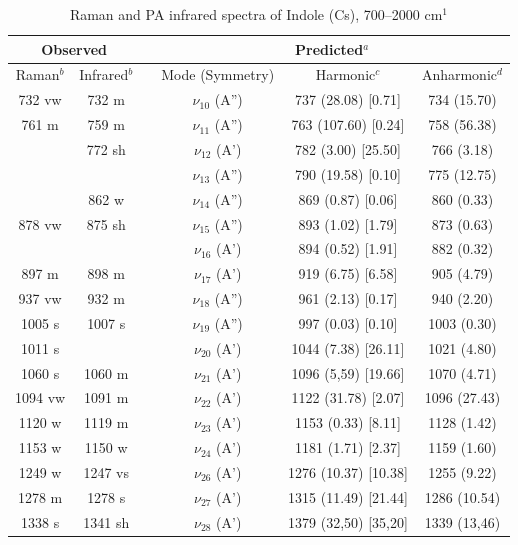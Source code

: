 	
		\begin{table}[H]
			\caption{Raman and PA infrared spectra of Indole (Cs), 700–2000 cm$^{1}$}
			\begin{center}
			\begin{tabular}{c c c c c c}
				\hline
				\multicolumn{ 2}{c}{Observed} & \multicolumn{1}{c}{} & \multicolumn{ 3}{c}{Predicted$^{a}$} \\ \hline
				Raman$^{b}$ & \multicolumn{1}{c}{Infrared$^{b}$} &  & \multicolumn{1}{c}{Mode (Symmetry)} & \multicolumn{1}{c}{Harmonic$^{c}$} & Anharmonic$^{d}$ \\ \hline
	732 vw & 732 m  &  & $\nu_{10}$ (A”) & 737 (28.08) [0.71] & 734 (15.70) \\ 
	761 m & 759 m &  & $\nu_{11}$ (A”) & 763 (107.60) [0.24] & 758 (56.38) \\ 
	& 772 sh &  & $\nu_{12}$ (A’) & 782 (3.00) [25.50] & 766 (3.18) \\ 
	&  &  & $\nu_{13}$ (A”) & 790 (19.58) [0.10] & 775 (12.75) \\ 
	& 862 w &  & $\nu_{14}$ (A”) & 869 (0.87) [0.06] & 860 (0.33) \\ 
	878 vw & 875 sh &  & $\nu_{15}$ (A”) & 893 (1.02) [1.79] & 873 (0.63) \\
	&  &  & $\nu_{16}$ (A’) & 894 (0.52) [1.91] & 882 (0.32) \\
	897 m & 898 m &  & $\nu_{17}$ (A’) & 919 (6.75) [6.58] & 905 (4.79) \\
	937 vw & 932 m &  & $\nu_{18}$ (A”) & 961 (2.13) [0.17] & 940 (2.20) \\ 
	1005 s & 1007 s &  & $\nu_{19}$ (A”) & 997 (0.03) [0.10] & 1003 (0.30) \\ 
	1011 s &  &  & $\nu_{20}$ (A’) & 1044 (7.38) [26.11] & 1021 (4.80) \\
	1060 s & 1060 m &  & $\nu_{21}$ (A’)& 1096 (5,59) [19.66] & 1070 (4.71)
	\\ 
		1094 vw & 1091 m &  & $\nu_{22}$ (A’)& 1122 (31.78) [2.07]	& 1096 (27.43)
		\\ 
		1120 w & 1119 m &  & \multicolumn{1}{c}{$\nu_{23}$ (A’)} & 1153 (0.33) [8.11] & 1128 (1.42) \\
		1153 w & 1150 w &  & $\nu_{24}$ (A’)
		& 1181 (1.71) [2.37]& 1159 (1.60)\\
		1249 w & 1247 vs &  & $\nu_{26}$ (A’) & 1276 (10.37) [10.38] & 1255 (9.22) \\ 
		1278 m & 1278 s &  & $\nu_{27}$ (A’) & 1315 (11.49) [21.44] &   1286 (10.54) \\ 
		1338 s & 1341 sh &  & \multicolumn{1}{c}{$\nu_{28}$ (A’)} & 1379 (32,50) [35,20] &  1339 (13,46) \\
	 \hline
\end{tabular}
\end{center}
\end{table}
	
